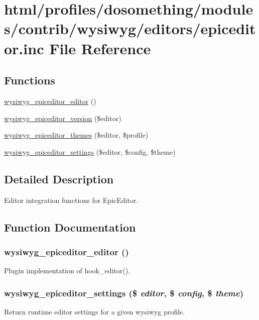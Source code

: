 \hypertarget{epiceditor_8inc}{
\section{html/profiles/dosomething/modules/contrib/wysiwyg/editors/epiceditor.inc File Reference}
\label{epiceditor_8inc}
}
\subsection*{Functions}
\begin{DoxyCompactItemize}
\item 
\hyperlink{epiceditor_8inc_a55c0993f6e458e1715c1abd4ec644fc5}{wysiwyg\_\-epiceditor\_\-editor} ()
\item 
\hyperlink{epiceditor_8inc_aba383a94bfa3f654a72ce95b108c6886}{wysiwyg\_\-epiceditor\_\-version} (\$editor)
\item 
\hyperlink{epiceditor_8inc_a25cfcf42e9d364fc39cdd8f2b4d76c5a}{wysiwyg\_\-epiceditor\_\-themes} (\$editor, \$profile)
\item 
\hyperlink{epiceditor_8inc_a6454988fef6b7e3349c1383305ba38a3}{wysiwyg\_\-epiceditor\_\-settings} (\$editor, \$config, \$theme)
\end{DoxyCompactItemize}


\subsection{Detailed Description}
Editor integration functions for EpicEditor. 

\subsection{Function Documentation}
\hypertarget{epiceditor_8inc_a55c0993f6e458e1715c1abd4ec644fc5}{
\subsubsection[{wysiwyg\_\-epiceditor\_\-editor}]{\setlength{\rightskip}{0pt plus 5cm}wysiwyg\_\-epiceditor\_\-editor ()}}
\label{epiceditor_8inc_a55c0993f6e458e1715c1abd4ec644fc5}
Plugin implementation of hook\_\-editor(). \hypertarget{epiceditor_8inc_a6454988fef6b7e3349c1383305ba38a3}{
\subsubsection[{wysiwyg\_\-epiceditor\_\-settings}]{\setlength{\rightskip}{0pt plus 5cm}wysiwyg\_\-epiceditor\_\-settings (\$ {\em editor}, \/  \$ {\em config}, \/  \$ {\em theme})}}
\label{epiceditor_8inc_a6454988fef6b7e3349c1383305ba38a3}
Return runtime editor settings for a given wysiwyg profile.


